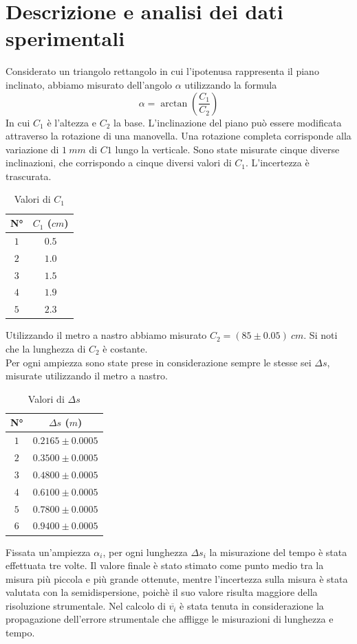 \documentclass[11pt]{article}
\begin{document}
\section{Descrizione e analisi dei dati sperimentali}

Considerato un triangolo rettangolo in cui l'ipotenusa rappresenta il piano inclinato, abbiamo misurato dell'angolo $\alpha$ utilizzando la formula
\begin{equation}
    \alpha=\arctan(\frac{C_1}{C_2})
\end{equation}
In cui $C_1$ è l'altezza e $C_2$ la base.
L'inclinazione del piano può essere modificata attraverso la rotazione di una manovella. Una rotazione completa corrisponde alla variazione di $1\ mm$ di $C1$ lungo la verticale. Sono state misurate cinque diverse inclinazioni, che corrispondo a cinque diversi valori di $C_1$. L'incertezza è trascurata.
\begin{table}[H]
\centering
\begin{tabular}{|c|c|}
\hline
\textbf{N°} & \textbf{$C_1$ ($cm$)} \\
\hline
$1$ & $0.5$ \\
$2$ & $1.0$ \\
$3$ & $1.5$ \\
$4$ & $1.9$ \\
$5$ & $2.3$ \\
\hline
\end{tabular}
\caption{Valori di $C_1$}
\label{tab:}
\end{table}
Utilizzando il metro a nastro abbiamo misurato $C_2=(85\pm 0.05)\ cm$. Si noti che la lunghezza di $C_2$ è costante. \\
Per ogni ampiezza sono state prese in considerazione sempre le stesse sei $\Delta s$, misurate utilizzando il metro a nastro. \\
\begin{table}[H]
\centering
\begin{tabular}{|c|c|}
\hline
\textbf{N°} & \textbf{$\Delta s$ ($m$)} \\
\hline
$1$ & $0.2165\pm 0.0005$ \\
$2$ & $0.3500\pm 0.0005$ \\
$3$ & $0.4800\pm 0.0005$ \\
$4$ & $0.6100\pm 0.0005$ \\
$5$ & $0.7800\pm 0.0005$ \\
$6$ & $0.9400\pm 0.0005$ \\
\hline
\end{tabular}
\caption{Valori di $\Delta s$}
\label{tab:}
\end{table}
Fissata un'ampiezza $\alpha_i$, per ogni lunghezza $\Delta s_i$ la misurazione del tempo è stata effettuata tre volte. Il valore finale è stato stimato come punto medio tra la misura più piccola e più grande ottenute, mentre l'incertezza sulla misura è stata valutata con la semidispersione, poichè il suo valore risulta maggiore della risoluzione strumentale. Nel calcolo di $\overline{v_i}$ è stata tenuta in considerazione la propagazione dell'errore strumentale che affligge le misurazioni di lunghezza e tempo.
\end{document}
